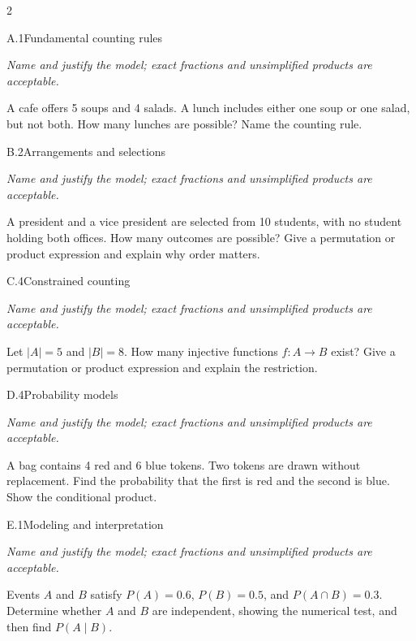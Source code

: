\documentclass[9pt]{extarticle}
\begin{document}
\begin{multicols}{2}
\begin{CoreProblem}{A.1}{Fundamental counting rules}
{\scriptsize\textit{Name and justify the model; exact fractions and unsimplified products are acceptable.}\par}
A cafe offers 5 soups and 4 salads. A lunch includes either one soup
    or one salad, but not both. How many lunches are possible? Name the counting
    rule.
\end{CoreProblem}
\begin{CoreProblem}{B.2}{Arrangements and selections}
{\scriptsize\textit{Name and justify the model; exact fractions and unsimplified products are acceptable.}\par}
A president and a vice president are selected from 10 students, with
    no student holding both offices. How many outcomes are possible? Give a
    permutation or product expression and explain why order matters.
\end{CoreProblem}
\begin{CoreProblem}{C.4}{Constrained counting}
{\scriptsize\textit{Name and justify the model; exact fractions and unsimplified products are acceptable.}\par}
Let $|A|=5$ and $|B|=8$. How many injective functions $f:A\to B$
    exist? Give a permutation or product expression and explain the restriction.
\end{CoreProblem}
\columnbreak
\begin{CoreProblem}{D.4}{Probability models}
{\scriptsize\textit{Name and justify the model; exact fractions and unsimplified products are acceptable.}\par}
A bag contains 4 red and 6 blue tokens. Two tokens are drawn without
    replacement. Find the probability that the first is red and the second is
    blue. Show the conditional product.
\end{CoreProblem}
\begin{CoreProblem}{E.1}{Modeling and interpretation}
{\scriptsize\textit{Name and justify the model; exact fractions and unsimplified products are acceptable.}\par}
Events $A$ and $B$ satisfy $P(A)=0.6$, $P(B)=0.5$, and
    $P(A\cap B)=0.3$. Determine whether $A$ and $B$ are independent, showing
    the numerical test, and then find $P(A\mid B)$.
\end{CoreProblem}
\end{multicols}
\CoreWorkArea
\FormBreak
{}
\end{document}
